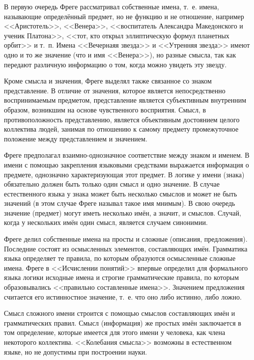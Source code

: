 \documentclass[a4paper,12pt]{article}
\begin{document}
	В первую очередь Фреге рассматривал собственные имена, т.~е. имена, называющие определённый предмет, но не функцию и не отношение, например <<Аристотель>>, <<Венера>>, <<воспитатель Александра Македонского и ученик Платона>>, <<тот, кто открыл эллиптическую формул планетных орбит>> и т.~п. Имена <<Вечернаяя звезда>> и <<Утренняя звезда>> имеют одно и то же значение (что и имя <<Венера>>), но разные смысла, так как передают различную информацию о том, когда можно увидеть эту звезду.
	
	Кроме смысла и значения, Фреге выделял также связанное со знаком представление. В отличие от значения, которое является непосредственно воспринимаемым предметом, представление является субъективным внутренним образом, возникшим на основе чувственного восприятия. Смысл, в противоположность представлению, является объективным достоянием целого коллектива людей, занимая по отношению к самому предмету промежуточное положение между представлением и значением.
	
	Фреге предполагал взаимно-однозначное соответствие между знаком и именем. В имени с помощью закрепления языковыми средствами выражается информация о предмете, однозначно характеризующая этот предмет. В логике у имени (знака) обязательно должен быть только один смысл и одно значение. В случае естественного языка у знака может быть несколько смыслов и может не быть значений (в этом случае Фреге называл такое имя мнимым). В свою очередь значение (предмет) могут иметь несколько имён, а значит, и смыслов. Случай, когда у нескольких имён один смысл, является случаем синонимии.
	
	Фреге делил собственные имена на просты и сложные (описания, предложения). Последние состоят из осмысленных элементов, составляющих имён. Грамматика языка определяет те правила, по которым образуются осмысленные сложные имена.  Фреге в <<Исчислении понятий>> впервые определил для формального языка логики исходные имена и строгие грамматические правила, по которым образовывались <<правильно составленные имена>>. Значением предложения считается его истинностное значение, т.~е. что оно либо истинно, либо ложно.
	
	Смысл сложного имени строится с помощью смыслов составляющих имён и грамматических правил. Смысл (информация) же простых имён заключается в том определение, которые имеется для этого имени у человека, как члена некоторого коллектива. <<Колебания смысла>> возможны в естественном языке, но не допустимы при построении науки.
	
\end{document}
